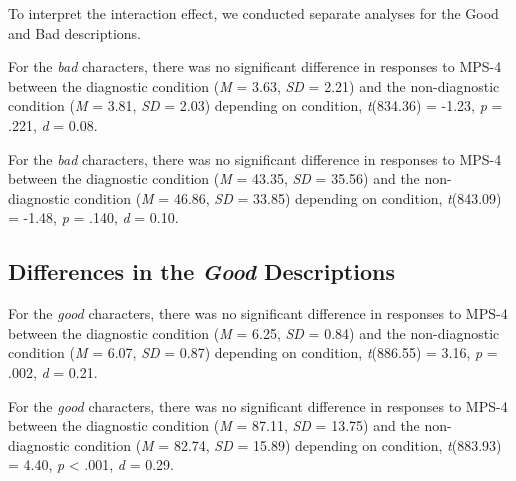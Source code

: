 \documentclass[
  english,
  man,floatsintext]{apa7}
\begin{document}
To interpret the interaction effect, we conducted separate analyses for the Good and Bad descriptions.

For the \emph{bad} characters, there was no significant difference in responses to MPS-4 between the diagnostic condition (\emph{M} = 3.63, \emph{SD} = 2.21) and the non-diagnostic condition (\emph{M} = 3.81, \emph{SD} = 2.03) depending on condition, \emph{t}(834.36) = -1.23, \emph{p} = .221, \emph{d} = 0.08.

For the \emph{bad} characters, there was no significant difference in responses to MPS-4 between the diagnostic condition (\emph{M} = 43.35, \emph{SD} = 35.56) and the non-diagnostic condition (\emph{M} = 46.86, \emph{SD} = 33.85) depending on condition, \emph{t}(843.09) = -1.48, \emph{p} = .140, \emph{d} = 0.10.

\hypertarget{differences-in-the-good-descriptions-1}{%
\subsection{\texorpdfstring{Differences in the \emph{Good} Descriptions}{Differences in the Good Descriptions}}\label{differences-in-the-good-descriptions-1}}

For the \emph{good} characters, there was no significant difference in responses to MPS-4 between the diagnostic condition (\emph{M} = 6.25, \emph{SD} = 0.84) and the non-diagnostic condition (\emph{M} = 6.07, \emph{SD} = 0.87) depending on condition, \emph{t}(886.55) = 3.16, \emph{p} = .002, \emph{d} = 0.21.

For the \emph{good} characters, there was no significant difference in responses to MPS-4 between the diagnostic condition (\emph{M} = 87.11, \emph{SD} = 13.75) and the non-diagnostic condition (\emph{M} = 82.74, \emph{SD} = 15.89) depending on condition, \emph{t}(883.93) = 4.40, \emph{p} \textless{} .001, \emph{d} = 0.29.
\end{document}
